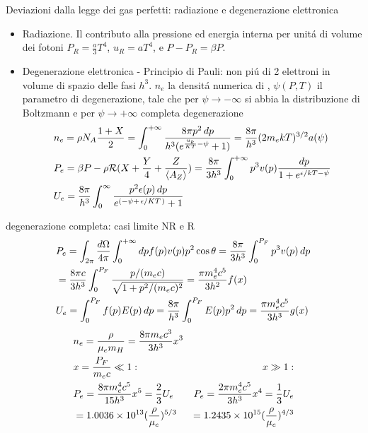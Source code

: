 \begin{wordonframe}{Deviazioni dalla legge dei gas perfetti: radiazione e degenerazione elettronica}
\begin{itemize}
	\item Radiazione. Il contributo alla pressione ed energia interna per unit\'a di volume dei fotoni $P_R=\frac{a}{3}T^4$, $u_R=aT^4$, e $P-P_R=\beta P$.
	\item Degenerazione elettronica - Principio di Pauli: non pi\'u di 2 elettroni in volume di spazio delle fasi $h^3$. $n_e$ la densit\'a numerica di \Pelectron, $\psi(P,T)$ il parametro di degenerazione, tale che per $\psi\to-\infty$ si abbia la distribuzione di Boltzmann e per $\psi\to+\infty$ completa degenerazione
	\begin{align*}
	&n_e=\rho N_A\frac{1+X}{2}=\int_{0}^{+\infty}{}\frac{8\pi p^2\,dp}{h^3(e^{\frac{u_k}{KT}-\psi}+1)}=\frac{8\pi}{h^3}(2m_ekT)^{3/2}a(\psi)\\
	&P_e=\beta P-\rho\mathcal{R}{}(X+\frac{Y}{4}+\frac{Z}{\langle A_Z \rangle})=\frac{8\pi}{3h^3}\int_{0}^{+\infty}{}p^3v(p)\frac{dp}{1+e^{\epsilon/kT-\psi}}\\
	&U_e=\frac{8\pi}{h^3}\int_0^{\infty}\frac{p^2\epsilon(p)\,dp}{e^{(-\psi+\left.{\epsilon}\middle/{KT}\right.)}+1}
	\end{align*}
\end{itemize}
\end{wordonframe}

\begin{frame}{degenerazione completa: casi limite NR e R}
\begin{align*}
&P_e=\int_{2\pi}\frac{d\Omega}{4\pi}\int_{0}^{+\infty}{}dpf(p)v(p)p^2\cos{\theta}=\frac{8\pi}{3h^3}\int_0^{P_F}p^3v(p)\,dp\\
&=\frac{8\pi c}{3h^3}\int_0^{P_F}\frac{p/(m_ec)}{\sqrt{1+p^2/(m_ec)^2}}=\frac{\pi m_e^4c^5}{3h^2}f(x)\\
&U_e=\int_0^{P_F}f(p)E(p)\,dp=\frac{8\pi}{h^3}\int_0^{P_F}E(p)p^2\,dp=\frac{\pi m_e^4c^5}{3h^3}g(x)\
\end{align*}
\begin{align*}
&n_e=\frac{\rho}{\mu_em_H}=\frac{8\pi m_ec^3}{3h^3}x^3\\
&x=\frac{P_F}{m_ec}\ll1:\quad&x\gg1:\\
&P_e=\frac{8\pi m_e^4c^5}{15h^3}x^5=\frac{2}{3}U_e&P_e=\frac{2\pi m_e^4c^5}{3h^3}x^4=\frac{1}{3}U_e\\
&=\num{1.0036e13}(\frac{\rho}{\mu_e})^{5/3}&=\num{1.2435e15}(\frac{\rho}{\mu_e})^{4/3}
\end{align*}
\end{frame}

